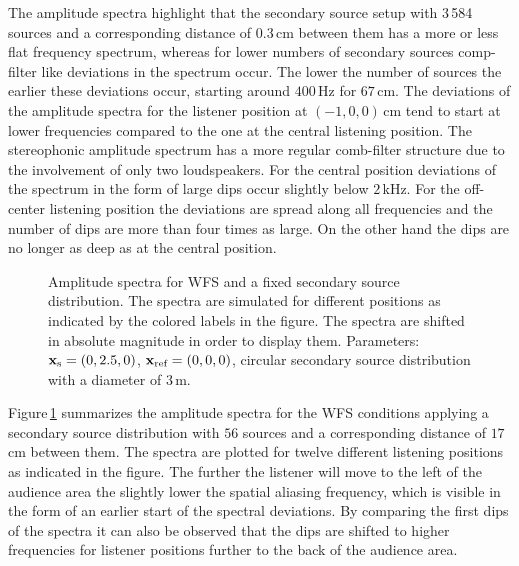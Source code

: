 The amplitude spectra highlight that the secondary source setup with 3\,584
sources and a corresponding distance of $0.3$\,cm between them has a more or
less flat frequency spectrum, whereas for lower numbers of secondary sources
comp-filter like deviations in the spectrum occur. The lower the number of
sources the earlier these deviations occur, starting around $400$\,Hz for 
$67$\,cm.
The deviations of the amplitude spectra for the listener position
at $(-1,0,0)$\,cm tend to start at lower frequencies compared to the one at the central
listening position.
The stereophonic amplitude spectrum has a more regular comb-filter structure due
to the involvement of only two loudspeakers. For the central position deviations
of the spectrum in the form of large dips occur slightly below $2$\,kHz.
For the off-center listening position the deviations are spread along all
frequencies and the number of dips are more than four times as large. On the
other hand the dips are no longer as deep as at the central position.

\begin{figure}
    \small
    \centering
    
    \caption{Amplitude spectra for \ac{WFS} and a fixed secondary source
    distribution. The spectra are simulated for different positions as
    indicated by the colored labels in the figure.
    The spectra are shifted in absolute magnitude in order to display
    them.
    Parameters: $\mathbf{x}_\text{s} = (0,2.5,0)$, $\mathbf{x}_\text{ref} = (0,0,0)$, circular secondary source
    distribution with a diameter of $3$\,m.
    }
    \label{fig:coloration_freq_response_moving}
\end{figure}
%
Figure\,\ref{fig:coloration_freq_response_moving} summarizes the amplitude
spectra for the \ac{WFS} conditions applying a secondary source distribution
with $56$ sources and a corresponding distance of $17$\,cm between them. The
spectra are plotted for twelve different listening positions as indicated in
the figure. The further the listener will move to the left of the audience area
the slightly lower the spatial aliasing frequency, which is visible in the form
of an earlier start of the spectral deviations. By comparing the
first dips of the spectra it can also be observed that the dips are shifted to
higher frequencies for listener positions further to the back of the audience
area.


